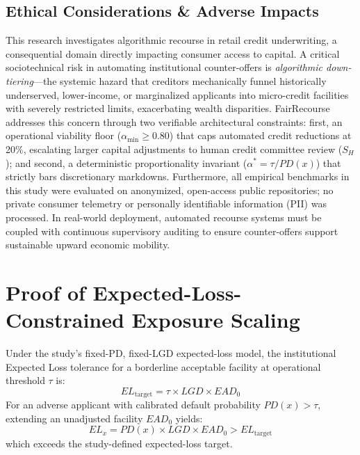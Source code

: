 \documentclass[manuscript,screen,review,anonymous]{acmart}
\begin{document}
\subsection*{Ethical Considerations \& Adverse Impacts}
This research investigates algorithmic recourse in retail credit underwriting, a consequential domain directly impacting consumer access to capital. A critical sociotechnical risk in automating institutional counter-offers is \emph{algorithmic down-tiering}---the systemic hazard that creditors mechanically funnel historically underserved, lower-income, or marginalized applicants into micro-credit facilities with severely restricted limits, exacerbating wealth disparities. FairRecourse addresses this concern through two verifiable architectural constraints: first, an operational viability floor ($\alpha_{\min} \ge 0.80$) that caps automated credit reductions at 20\%, escalating larger capital adjustments to human credit committee review ($S_H$); and second, a deterministic proportionality invariant ($\alpha^* = \tau / PD(x)$) that strictly bars discretionary markdowns. Furthermore, all empirical benchmarks in this study were evaluated on anonymized, open-access public repositories; no private consumer telemetry or personally identifiable information (PII) was processed. In real-world deployment, automated recourse systems must be coupled with continuous supervisory auditing to ensure counter-offers support sustainable upward economic mobility.

\clearpage
\appendix

\section{Proof of Expected-Loss-Constrained Exposure Scaling}
\label{app:proof}
Under the study's fixed-PD, fixed-LGD expected-loss model, the institutional Expected Loss tolerance for a borderline acceptable facility at operational threshold $\tau$ is:
\begin{equation}
EL_{\text{target}} = \tau \times LGD \times EAD_0
\end{equation}
For an adverse applicant with calibrated default probability $PD(x) > \tau$, extending an unadjusted facility $EAD_0$ yields:
\begin{equation}
EL_x = PD(x) \times LGD \times EAD_0 > EL_{\text{target}}
\end{equation}
which exceeds the study-defined expected-loss target.
\end{document}
